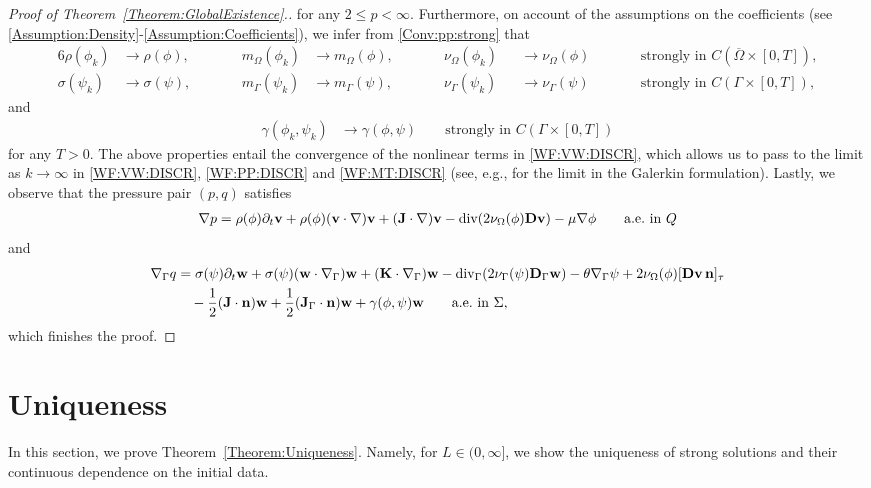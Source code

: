 \documentclass[10pt,reqno]{amsart}
\theoremstyle{remark}
\numberwithin{equation}{section}
\newcommand{\n}{\mathbf{n}}
\newcommand{\bv}{\mathbf{v}}
\newcommand{\bw}{\mathbf{w}}
\newcommand{\J}{\mathbf{J}}
\newcommand{\K}{\mathbf{K}}
\newcommand{\D}{\mathbf{D}}
\newcommand{\Dg}{\mathbf{D}_\Gamma}
\newcommand{\delt}{\partial_{t}}
\newcommand{\Grad}{\nabla}
\newcommand{\Div}{\textnormal{div}}
\newcommand{\Gradg}{\nabla_\Ga}
\newcommand{\Divg}{\textnormal{div}_\Ga}
\newcommand{\Om}{\Omega}
\newcommand{\Ga}{\Gamma}
\begin{document}
\begin{proof}[Proof of Theorem~\ref{Theorem:GlobalExistence}.]
for any $2 \leq p < \infty$. Furthermore, on account of the assumptions on the coefficients (see \ref{Assumption:Density}-\ref{Assumption:Coefficients}), we infer from \eqref{Conv:pp:strong} that
\begin{alignat*}{6}
    \rho(\phi_k) &\rightarrow \rho(\phi), &&\qquad m_\Om(\phi_k) &\rightarrow m_\Om(\phi), &&\qquad \nu_\Om(\phi_k) &&\rightarrow \nu_\Om(\phi) &&\qquad\text{strongly in~} C(\overline{\Om}\times[0,T]), \\
    \sigma(\psi_k) &\rightarrow \sigma(\psi), &&\qquad 
    m_\Ga(\psi_k) &\rightarrow m_\Ga(\psi), &&\qquad \nu_\Ga(\psi_k) &&\rightarrow \nu_\Ga(\psi) &&\qquad\text{strongly in~} C(\Ga\times[0,T]),
\end{alignat*}
and
\begin{align*}
        \gamma(\phi_k,\psi_k) &\rightarrow \gamma(\phi,\psi) \qquad\text{strongly in~} C(\Ga\times[0,T])
\end{align*}
for any $T > 0$.
The above properties entail the convergence of the nonlinear terms in \eqref{WF:VW:DISCR}, which allows us to pass to the limit as $k\rightarrow\infty$ in \eqref{WF:VW:DISCR}, \eqref{WF:PP:DISCR} and \eqref{WF:MT:DISCR} (see, e.g., \cite{Knopf2025a} for the limit in the Galerkin formulation). Lastly, we observe that the pressure pair $(p,q)$ satisfies
\begin{align*}
    \Grad p = \rho(\phi)\delt\bv + \rho(\phi)(\bv\cdot\Grad)\bv + (\J\cdot\Grad)\bv - \Div(2\nu_\Om(\phi)\D\bv) - \mu\Grad\phi \qquad\text{a.e.~in~}Q
\end{align*}
and
\begin{align*}
    \Gradg q &= \sigma(\psi)\delt\bw + \sigma(\psi)(\bw\cdot\Gradg)\bw + (\K\cdot\Gradg)\bw - \Divg(2\nu_\Ga(\psi)\Dg\bw) - \theta\Gradg\psi + 2\nu_\Om(\phi)[\D\bv\,\n]_\tau \\
    &\quad - \frac12(\J\cdot\n)\bw + \frac12(\J_\Ga\cdot\n)\bw + \gamma(\phi,\psi)\bw \qquad\text{a.e.~in~}\Sigma,
\end{align*}
which finishes the proof.
\end{proof}

\medskip

\section{Uniqueness}
\label{Section:Uniqueness}

In this section, we prove Theorem~\ref{Theorem:Uniqueness}. Namely, for $L\in(0,\infty]$, we show the uniqueness of strong solutions and their continuous dependence on the initial data. 
\end{document}

